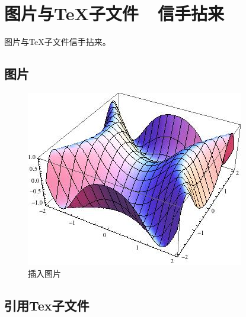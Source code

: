 \section{图片与TeX子文件\ \ 信手拈来}

图片与TeX子文件信手拈来。

\subsection{图片}

\begin{figure}
    \centering
    \includegraphics[scale=0.4]{include_picture/picture.jpg}
    \caption{插入图片}
\end{figure}

\subsection{引用Tex子文件}




